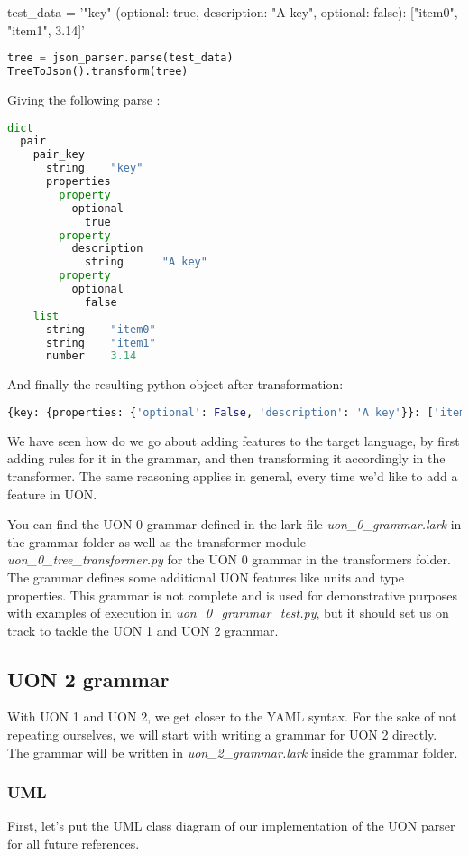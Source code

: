 \documentclass[12pt]{article}
\begin{document}
test\_data = '{"key" (optional: true, description: "A key", optional: false): ["item0", "item1", 3.14]}'
\begin{lstlisting}[language=Python]
tree = json_parser.parse(test_data)
TreeToJson().transform(tree)
\end{lstlisting}
Giving the following parse :
\begin{lstlisting}[language=Python]
dict
  pair
    pair_key
      string    "key"
      properties
        property
          optional
            true
        property
          description
            string      "A key"
        property
          optional
            false
    list
      string    "item0"
      string    "item1"
      number    3.14
\end{lstlisting}
And finally the resulting python object after transformation:
\begin{lstlisting}[language=Python]
{key: {properties: {'optional': False, 'description': 'A key'}}: ['item0', 'item1', 3.14]}
\end{lstlisting}

We have seen how do we go about adding features to the target language, by first adding rules for it in the grammar, and then transforming it accordingly in the transformer. The same reasoning applies in general, every time we'd like to add a feature in UON.

You can find the UON 0 grammar defined in the lark file \emph{uon\_0\_grammar.lark} in the grammar folder as well as the transformer module \emph{uon\_0\_tree\_transformer.py} for the UON 0 grammar in the transformers folder. The grammar defines some additional UON features like units and type properties. This grammar is not complete and is used for demonstrative purposes with examples of execution in \emph{uon\_0\_grammar\_test.py}, but it should set us on track to tackle the UON 1 and UON 2 grammar.

\pagebreak

\subsection{UON 2 grammar}
With UON 1 and UON 2, we get closer to the YAML syntax. For the sake of not repeating ourselves, we will start with writing a grammar for UON 2 directly. The grammar will be written in \emph{uon\_2\_grammar.lark} inside the grammar folder.

\subsubsection{UML}
First, let's put the UML class diagram of our implementation of the UON parser for all future references.
\end{document}

